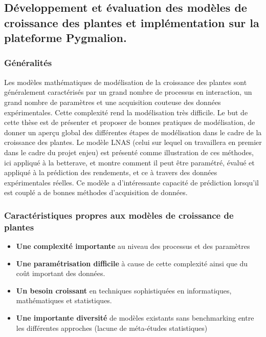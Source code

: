 \subsection{Développement et évaluation des modèles de croissance des plantes et implémentation sur la plateforme Pygmalion.}

\subsubsection{Généralités}

Les modèles mathématiques de modélisation de la croissance des plantes sont généralement caractérisés par un grand nombre de processus en interaction,  un grand nombre de paramètres et une acquisition couteuse des données expérimentales. Cette complexité rend la modélisation très difficile. Le but de cette thèse est de présenter et proposer de bonnes pratiques de modélisation, de donner un aperçu global des différentes étapes de modélisation dans le cadre de la croissance des plantes.
Le modèle LNAS (celui sur lequel on travaillera en premier dans le cadre du projet enjeu) est présenté comme illustration de ces méthodes, ici appliqué à la betterave, et montre comment il peut être paramétré, évalué et appliqué à la prédiction des rendements, et ce à travers des données expérimentales réelles. Ce modèle a d’intéressante capacité de prédiction lorsqu’il est couplé a de bonnes méthodes d’acquisition de données.

\subsubsection{Caractéristiques propres aux modèles de croissance de plantes}

\begin{itemize}

\item \textbf{Une complexité importante} au niveau des processus et des paramètres
\item \textbf{Une paramétrisation difficile} à cause de cette complexité ainsi que du coût important des données.
\item \textbf{Un besoin croissant} en techniques sophistiquées en informatiques, mathématiques et statistiques.
\item \textbf{Une importante diversité} de modèles existants sans benchmarking entre les différentes approches (lacune de méta-études statistiques)

\end{itemize}

